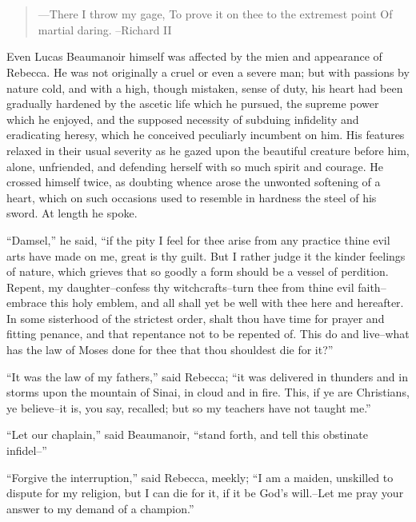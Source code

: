 \chapter{}

\begin{quote}
---There I throw my gage,
To prove it on thee to the extremest point
Of martial daring.
--Richard II
\end{quote}

Even Lucas Beaumanoir himself was affected by the mien and appearance of
Rebecca. He was not originally a cruel or even a severe man; but with
passions by nature cold, and with a high, though mistaken, sense of
duty, his heart had been gradually hardened by the ascetic life which he
pursued, the supreme power which he enjoyed, and the supposed necessity
of subduing infidelity and eradicating heresy, which he conceived
peculiarly incumbent on him. His features relaxed in their usual
severity as he gazed upon the beautiful creature before him, alone,
unfriended, and defending herself with so much spirit and courage. He
crossed himself twice, as doubting whence arose the unwonted softening
of a heart, which on such occasions used to resemble in hardness the
steel of his sword. At length he spoke.

``Damsel,'' he said, ``if the pity I feel for thee arise from any
practice thine evil arts have made on me, great is thy guilt. But I
rather judge it the kinder feelings of nature, which grieves that so
goodly a form should be a vessel of perdition. Repent, my
daughter--confess thy witchcrafts--turn thee from thine evil
faith--embrace this holy emblem, and all shall yet be well with thee
here and hereafter. In some sisterhood of the strictest order, shalt
thou have time for prayer and fitting penance, and that repentance not
to be repented of. This do and live--what has the law of Moses done for
thee that thou shouldest die for it?''

``It was the law of my fathers,'' said Rebecca; ``it was delivered in
thunders and in storms upon the mountain of Sinai, in cloud and in fire.
This, if ye are Christians, ye believe--it is, you say, recalled; but so
my teachers have not taught me.''

``Let our chaplain,'' said Beaumanoir, ``stand forth, and tell this
obstinate infidel--''

``Forgive the interruption,'' said Rebecca, meekly; ``I am a maiden,
unskilled to dispute for my religion, but I can die for it, if it be
God's will.--Let me pray your answer to my demand of a champion.''

